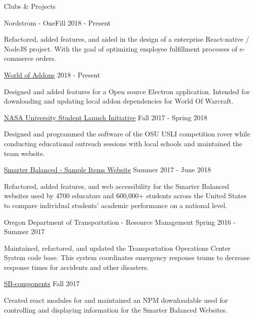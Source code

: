 \documentclass{resume} %
\begin{document}
\begin{rSection}{Clubs \& Projects}
  \begin{rSubsection} {Nordstrom - OneFill} {2018 - Present} {} {}
  \item Refactored, added features, and aided in the design of a enterprise React-native / NodeJS project. With the goal of optimizing employee fulfillment processes of e-commerce orders.
  \end{rSubsection}

  \begin{rSubsection} {\href{https://github.com/WorldofAddons/worldofaddons}{World of Addons}} {2018 - Present} {} {}
  \item Designed and added features for a Open source Electron application. Intended for downloading and updating local addon dependencies for World Of Warcraft.
  \end{rSubsection}
  
  \begin{rSubsection} {\href{http://osuusli.com}{NASA University Student Launch Initiative}} {Fall 2017 - Spring 2018} {} {}
  \item Designed and programmed the software of the OSU USLI competition rover while conducting educational outreach sessions with local schools and maintained the team website.
  \end{rSubsection}

  \begin{rSubsection} {\href{http://sampleitems.smarterbalanced.org}{Smarter Balanced - Sample Items Website}} {Summer 2017 - June 2018} {} {}
  \item Refactored, added features, and web accessibility for the Smarter Balanced websites used by 4700 educators and 600,000+ students across the United States to compare individual students' academic performance on a national level.
  \end{rSubsection}

  \begin{rSubsection} {Oregon Department of Transportation - Resource Management} {Spring 2016 - Summer 2017} {} {}
  \item Maintained, refactored, and updated the Transportation Operations Center System code base. This system coordinates emergency response teams to decrease response times for accidents and other disasters.
  \end{rSubsection}

  \begin{rSubsection} {\href{https://www.npmjs.com/package/@osu-cass/sb-components}{SB-components}} {Fall 2017} {} {}
  \item Created react modules for and maintained an NPM downloadable used for controlling and displaying information for the Smarter Balanced Websites.
  \end{rSubsection}

\end{rSection}
\end{document}
